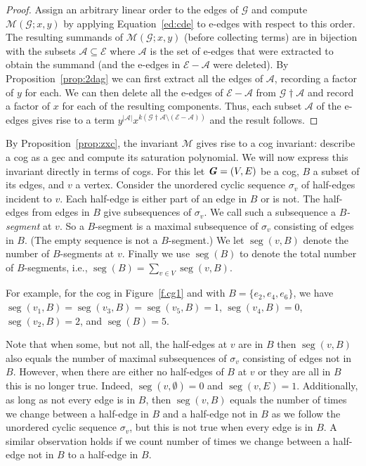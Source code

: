 \documentclass{amsart}
\newcommand{\E}{\mathcal{E}}
\newcommand{\gec}[1]{\mathcal{#1}}
\newcommand{\calM}{\mathcal{M}}
\newcommand{\cog}[1]{\textbf{\textit #1}}
\newcommand{\ext}{\mathbin{\dagger}}
\DeclareMathOperator{\seg}{seg}
\theoremstyle{definition}
\theoremstyle{remark}
\numberwithin{equation}{section}
\begin{document}
\begin{proof}
Assign an arbitrary linear order to the edges of $\gec{G}$ and compute $\calM(\gec{G};x,y)$ by applying Equation~\eqref{ed:cde} to e-edges with respect to this order. The resulting summands  of $\calM(\gec{G};x,y)$ (before collecting terms) are in bijection with the subsets $\mathcal{A}\subseteq \E$ where $\mathcal{A}$ is the set of e-edges that were extracted to obtain the summand (and the e-edges in $\E-\mathcal{A}$ were deleted). By Proposition~\ref{prop:2dag} we can first extract all the edges of $\mathcal{A}$, recording a factor of $y$ for each.  We can then delete all the e-edges of $\E-\mathcal{A}$ from $\gec{G}\ext \mathcal{A} $  and record a factor of $x$ for each of the resulting components. 
 Thus, each subset $\mathcal{A}$ of the e-edges gives rise to a term $y^{|\mathcal{A}|}x^{k(\gec{G}\ext \mathcal{A} \setminus (\mathcal{E}-\mathcal{A}))}$ and the result follows.
\end{proof}


\medskip


By  Proposition~\ref{prop:zxc}, the invariant  $\calM$ gives rise to a cog invariant: describe a cog as a gec and compute its saturation polynomial.   
We will now express this invariant  directly in terms of cogs. 
 For this let $\cog{G}=(V,E)$ be a cog, $B$ a subset of its edges, and $v$ a vertex. Consider the unordered cyclic sequence $\sigma_v$ of half-edges incident to $v$. Each half-edge is either part of an edge in $B$ or is not. The half-edges from edges in $B$ give subsequences of $\sigma_v$. We call such a subsequence a \emph{$B$-segment} at $v$. So a $B$-segment is a maximal subsequence of $\sigma_v$ consisting of edges in $B$. (The empty sequence is not a $B$-segment.) 
 We let $\seg(v,B)$ denote the number of $B$-segments at $v$. 
 Finally we use $\seg(B)$ to denote the total number of $B$-segments, i.e., $\seg(B) = \sum_{v\in V} \seg(v,B)$. 

 For example, for the cog in Figure~\ref{f.cg1} and with $B=\{e_2, e_4,e_6 \}$, we have $\seg(v_1,B)=\seg(v_3,B)=\seg(v_5,B)=1$, $\seg(v_4,B)=0$, $\seg(v_2,B)=2$, and $\seg(B)=5$.

 

  Note that when some, but not all, the half-edges at $v$ are in $B$ then $\seg(v,B)$ also equals the number of maximal subsequences of $\sigma_v$ consisting of edges not in $B$. 
However, when there are either no half-edges of $B$ at $v$ or they are all in $B$ this is no longer true. Indeed, $\seg(v,\emptyset)=0$ and $\seg(v,E)=1$. 
  Additionally, as long as not every edge is in $B$, then $\seg(v,B)$  equals the number of times we change between a half-edge
in $B$ and a half-edge not in $B$ as we follow the unordered cyclic sequence $\sigma_v$, but this is not true when every edge is in $B$. A similar observation holds if we count number of times we change between a half-edge not in $B$ to a half-edge  in $B$.
  
\end{document}
